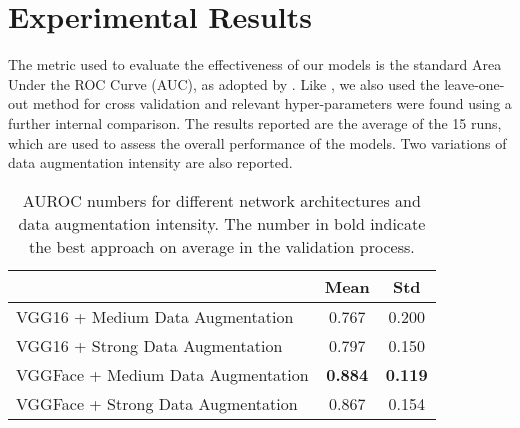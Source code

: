 \chapter{Experimental Results}

The metric used to evaluate the effectiveness of our models is the standard Area Under the ROC Curve (AUC), as adopted by \cite{abs-1807-01631}. Like \cite{CelonaM17}, we also used the leave-one-out method for cross validation and relevant hyper-parameters were found using a further internal comparison. The results reported are the average of the 15 runs, which are used to assess the overall performance of the models. Two variations of data augmentation intensity are also reported.

\begin{table}[h!]
\centering
\caption{AUROC numbers for different network architectures and data augmentation intensity. The number in bold indicate the best approach on average in the validation process.}
\label{tab:results}
\begin{tabular}{lcc}
\hline
\multicolumn{1}{c}{}               & Mean           & Std            \\ \hline
VGG16 + Medium Data Augmentation   & 0.767          & 0.200          \\
VGG16 + Strong Data Augmentation   & 0.797          & 0.150          \\
VGGFace + Medium Data Augmentation & \textbf{0.884} & \textbf{0.119} \\
VGGFace + Strong Data Augmentation & 0.867          & 0.154          \\ \hline
\end{tabular}
\end{table}